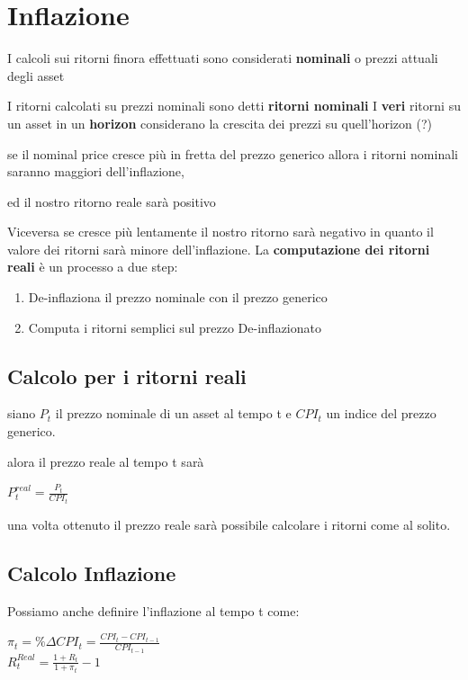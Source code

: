 \documentclass[a4paper,11pt]{report}
\begin{document}
{\section{Inflazione}
	I calcoli sui ritorni finora effettuati sono considerati \textbf{nominali} o prezzi attuali degli asset

	I ritorni calcolati su prezzi nominali sono detti \textbf{ritorni nominali} \newline
	I \textbf{veri} ritorni su un asset in un \textbf{horizon} considerano la crescita dei prezzi su quell'horizon (?)
	
	se il nominal price cresce più in fretta del prezzo generico allora i ritorni nominali saranno maggiori dell'inflazione,
	
	 ed il nostro ritorno reale sarà positivo

	Viceversa se cresce più lentamente il nostro ritorno sarà negativo in quanto il valore dei ritorni sarà minore dell'inflazione. 		\newline
	La \textbf{computazione dei ritorni reali} è un processo a due step:
\begin{enumerate}
	\item De-inflaziona il prezzo nominale con il prezzo generico
	\item Computa i ritorni semplici sul prezzo De-inflazionato
\end{enumerate}
\subsection{Calcolo per i ritorni reali}
	siano $P_t$ il prezzo nominale di un asset al tempo t e $CPI_t$ un indice del prezzo generico.
	
	alora il prezzo reale al tempo t sarà
\begin{center}
	$P_t^{real} = {\frac {P_t}{CPI_t}}$	
\end{center}
	una volta ottenuto il prezzo reale sarà possibile calcolare i ritorni come al solito. 
\subsection{Calcolo Inflazione}
	Possiamo anche definire l'inflazione al tempo t come:
\begin{center}
	$\pi_t = \%\Delta CPI_t = {\frac {CPI_t - CPI_{t-1}}{CPI_{t-1}}} $ \\
	$R_t^{Real}= {\frac {1+R_t}{1+ \pi_t}} - 1 $ 
\end{center} 
\newpage

}
\end{document}
